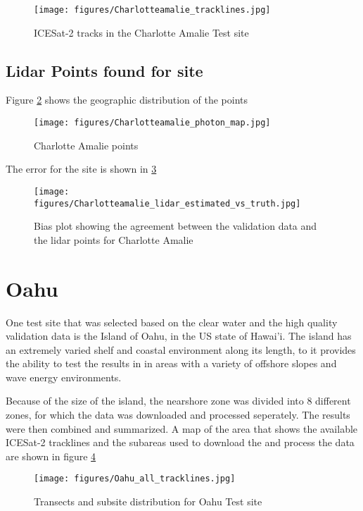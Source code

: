 \begin{figure}[h!]
    \centering
    \texttt{[image: figures/Charlotteamalie\_tracklines.jpg]}
    \caption{ICESat-2 tracks in the Charlotte Amalie Test site}
    \label{fig:charlotteamalie-tracklines}
\end{figure}

\subsection{Lidar Points found for site}
Figure \ref{fig:point-map-charlotteamalie} shows the geographic distribution of the points

\begin{figure}[h!]
    \centering
    \texttt{[image: figures/Charlotteamalie\_photon\_map.jpg]}
    \caption{Charlotte Amalie points}
    \label{fig:point-map-charlotteamalie}
\end{figure}

The error for the site is shown in \ref{fig:charlotteamalie-lidar-bias}

\begin{figure}[h!]
    \centering
    \texttt{[image: figures/Charlotteamalie\_lidar\_estimated\_vs\_truth.jpg]}
    \caption{Bias plot showing the agreement between the validation data and the lidar points for Charlotte Amalie}
    \label{fig:charlotteamalie-lidar-bias}
\end{figure}


\section{Oahu}
One test site that was selected based on the clear water and the high quality validation data is the Island of Oahu, in the US state of Hawai'i. The island has an extremely varied shelf and coastal environment along its length, to it provides the ability to test the results in in areas with a variety of offshore slopes and wave energy environments.

Because of the size of the island, the nearshore zone was divided into 8 different zones, for which the data was downloaded and processed seperately. The results were then combined and summarized. A map of the area that shows the available ICESat-2 tracklines and the subareas used to download the and process the data are shown in figure \ref{fig:oahu-all-sites-transects}

\begin{figure}[h!]
    \centering
    \texttt{[image: figures/Oahu\_all\_tracklines.jpg]}
    \caption{Transects and subsite distribution for Oahu Test site}
    \label{fig:oahu-all-sites-transects}
\end{figure}

